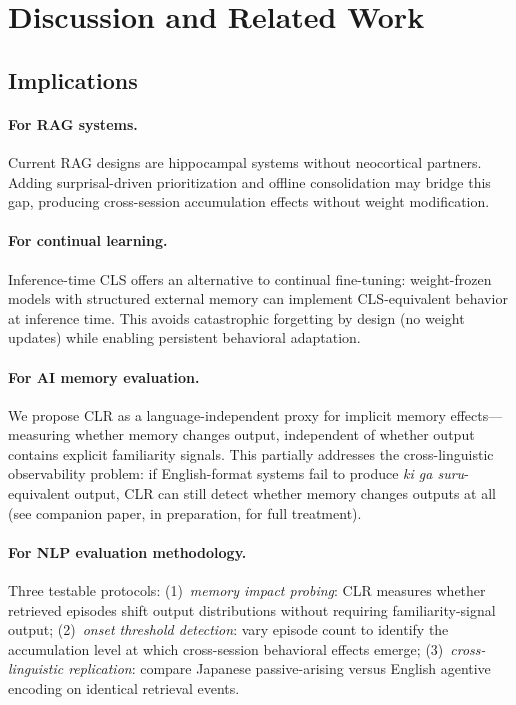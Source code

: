 \documentclass[11pt]{article}
\begin{document}

\section{Discussion and Related Work}

\subsection*{Implications}

\paragraph{For RAG systems.}
Current RAG designs are hippocampal systems without neocortical
partners. Adding surprisal-driven prioritization and offline
consolidation may bridge this gap, producing cross-session
accumulation effects without weight modification.

\paragraph{For continual learning.}
Inference-time CLS offers an alternative to continual fine-tuning:
weight-frozen models with structured external memory can implement
CLS-equivalent behavior at inference time. This avoids catastrophic
forgetting by design (no weight updates) while enabling persistent
behavioral adaptation.

\paragraph{For AI memory evaluation.}
We propose CLR as a language-independent proxy for implicit memory
effects---measuring whether memory changes output, independent of
whether output contains explicit familiarity signals. This partially
addresses the cross-linguistic observability problem: if English-format
systems fail to produce \textit{ki ga suru}-equivalent output, CLR can
still detect whether memory changes outputs at all (see companion paper,
in preparation, for full treatment).

\paragraph{For NLP evaluation methodology.}
Three testable protocols: (1)~\textit{memory impact probing}: CLR
measures whether retrieved episodes shift output distributions without
requiring familiarity-signal output; (2)~\textit{onset threshold detection}:
vary episode count to identify the accumulation level at which cross-session
behavioral effects emerge; (3)~\textit{cross-linguistic replication}:
compare Japanese passive-arising versus English agentive encoding on
identical retrieval events.
\end{document}

